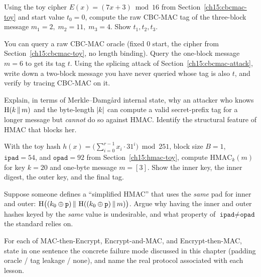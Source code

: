 \begin{exercise}
Using the toy cipher $E(x)=(7x+3)\bmod 16$ from Section~\ref{ch15:cbcmac-toy} and start value $t_0=0$, compute the raw CBC-MAC tag of the three-block message $m_1=2,\;m_2=11,\;m_3=4$. Show $t_1,t_2,t_3$.
\end{exercise}

\begin{exercise}
You can query a raw CBC-MAC oracle (fixed $0$ start, the cipher from Section~\ref{ch15:cbcmac-toy}, no length binding). Query the one-block message $m=6$ to get its tag $t$. Using the splicing attack of Section~\ref{ch15:cbcmac-attack}, write down a two-block message you have never queried whose tag is also $t$, and verify by tracing CBC-MAC on it.
\end{exercise}

\begin{exercise}
Explain, in terms of Merkle--Damg\aa{}rd internal state, why an attacker who knows $\operatorname{H}(k\,\|\, m)$ and the byte-length $\lvert k\rvert$ can compute a valid secret-prefix tag for a longer message but \emph{cannot} do so against HMAC. Identify the structural feature of HMAC that blocks her.
\end{exercise}

\begin{exercise}
With the toy hash $h(x)=\bigl(\sum_{i=0}^{r-1} x_i\cdot 31^{i}\bigr)\bmod 251$, block size $B=1$, $\texttt{ipad}=54$, and $\texttt{opad}=92$ from Section~\ref{ch15:hmac-toy}, compute $\mathrm{HMAC}_k(m)$ for key $k=20$ and one-byte message $m=[3]$. Show the inner key, the inner digest, the outer key, and the final tag.
\end{exercise}

\begin{exercise}
Suppose someone defines a ``simplified HMAC'' that uses the \emph{same} pad for inner and outer: $\operatorname{H}\bigl((k_0\oplus\texttt{p})\,\|\,\operatorname{H}((k_0\oplus\texttt{p})\,\|\, m)\bigr)$. Argue why having the inner and outer hashes keyed by the \emph{same} value is undesirable, and what property of $\texttt{ipad}\ne\texttt{opad}$ the standard relies on.
\end{exercise}

\begin{exercise}
For each of MAC-then-Encrypt, Encrypt-and-MAC, and Encrypt-then-MAC, state in one sentence the concrete failure mode discussed in this chapter (padding oracle / tag leakage / none), and name the real protocol associated with each lesson.
\end{exercise}


